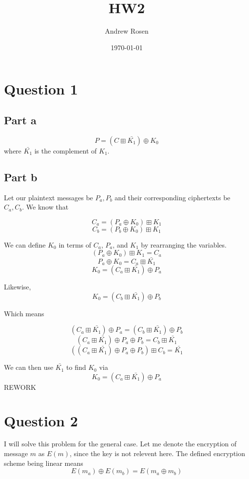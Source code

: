 \documentclass[a4paper,10pt]{article}
\title{HW2}
\author{Andrew Rosen}
\date{\today}
\begin{document}
\maketitle
\section{Question 1}

\subsection{Part a}
$$P = (C \boxplus \bar{K_{1}}) \oplus K_{0}$$ where $\bar{K_{1}}$ is the complement of $K_{1}$. 
\subsection{Part b}
Let our plaintext messages be $P_{a}, P_{b} $ and their corresponding ciphertexts be $C_{a}, C_{b}$.  We know that

$$ C_{a} = (P_{a} \oplus K_{0}) \boxplus K_{1} $$
$$ C_{b} = (P_{b} \oplus K_{0}) \boxplus K_{1} $$

We can define $K_{0}$ in terms of $C_{a}$, $P_{a}$, and $K_{1}$ by rearranging the variables.   
$$ (P_{a} \oplus K_{0}) \boxplus K_{1}  = C_{a} $$
$$  P_{a} \oplus K_{0} = C_{a} \boxplus \bar{K_{1}} $$
$$  K_{0} = (C_{a} \boxplus \bar{K_{1}}) \oplus P_{a} $$

Likewise,
$$  K_{0} = (C_{b} \boxplus \bar{K_{1}}) \oplus P_{b} $$

Which means

$$(C_{a} \boxplus \bar{K_{1}}) \oplus P_{a} = (C_{b} \boxplus \bar{K_{1}}) \oplus P_{b} $$
$$(C_{a} \boxplus \bar{K_{1}}) \oplus P_{a} \oplus P_{b} = C_{b} \boxplus \bar{K_{1}}$$
$$\left(\left(C_{a} \boxplus \bar{K_{1}}\right) \oplus P_{a} \oplus P_{b}\right) \boxplus C_{b} =  \bar{K_{1}}$$

We can then use  $\bar{K_{1}}$ to find $K_{0}$ via
$$  K_{0} = (C_{a} \boxplus \bar{K_{1}}) \oplus P_{a} $$
REWORK

\section{Question 2}

I will solve this problem for the general case.  Let me denote the encryption of message $m$ as $E(m)$, since the key is not relevent here.  The defined encryption scheme being linear means 
$$E(m_{a}) \oplus E(m_{b})  =  E(m_{a} \oplus m_{b})$$
\end{document}
